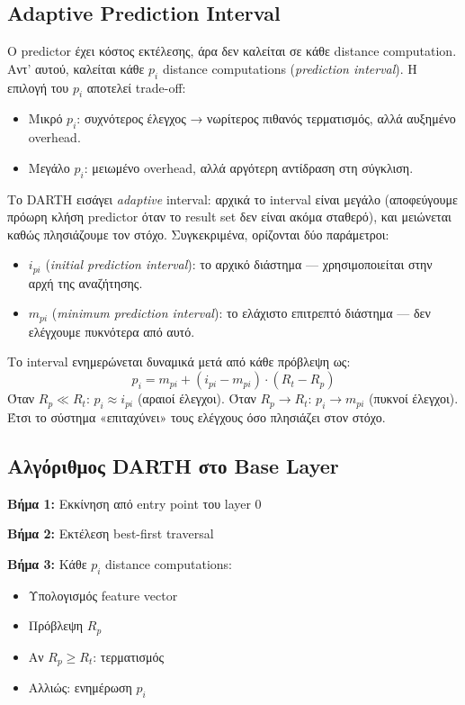 \documentclass[12pt,a4paper]{article}
\begin{document}
\subsection{Adaptive Prediction Interval}

Ο predictor έχει κόστος εκτέλεσης, άρα δεν καλείται σε κάθε distance computation. Αντ' αυτού, καλείται κάθε $p_i$ distance computations (\emph{prediction interval}). Η επιλογή του $p_i$ αποτελεί trade-off:
\begin{itemize}
  \item Μικρό $p_i$: συχνότερος έλεγχος → νωρίτερος πιθανός τερματισμός, αλλά αυξημένο overhead.
  \item Μεγάλο $p_i$: μειωμένο overhead, αλλά αργότερη αντίδραση στη σύγκλιση.
\end{itemize}

Το DARTH εισάγει \emph{adaptive} interval: αρχικά το interval είναι μεγάλο (αποφεύγουμε πρόωρη κλήση predictor όταν το result set δεν είναι ακόμα σταθερό), και μειώνεται καθώς πλησιάζουμε τον στόχο. Συγκεκριμένα, ορίζονται δύο παράμετροι:
\begin{itemize}
  \item $i_{pi}$ (\emph{initial prediction interval}): το αρχικό διάστημα — χρησιμοποιείται στην αρχή της αναζήτησης.
  \item $m_{pi}$ (\emph{minimum prediction interval}): το ελάχιστο επιτρεπτό διάστημα — δεν ελέγχουμε πυκνότερα από αυτό.
\end{itemize}

Το interval ενημερώνεται δυναμικά μετά από κάθε πρόβλεψη ως:
\[
p_i = m_{pi} + (i_{pi} - m_{pi}) \cdot (R_t - R_p)
\]
Όταν $R_p \ll R_t$: $p_i \approx i_{pi}$ (αραιοί έλεγχοι). Όταν $R_p \to R_t$: $p_i \to m_{pi}$ (πυκνοί έλεγχοι). Έτσι το σύστημα «επιταχύνει» τους ελέγχους όσο πλησιάζει στον στόχο.

\subsection{Αλγόριθμος DARTH στο Base Layer}

\textbf{Βήμα 1:} Εκκίνηση από entry point του layer 0

\textbf{Βήμα 2:} Εκτέλεση best-first traversal

\textbf{Βήμα 3:} Κάθε $p_i$ distance computations:

\begin{itemize}
    \item Υπολογισμός feature vector
    \item Πρόβλεψη $R_p$
    \item Αν $R_p \ge R_t$: τερματισμός
    \item Αλλιώς: ενημέρωση $p_i$
\end{itemize}
\end{document}

